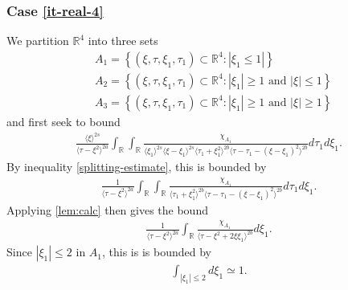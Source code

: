 \documentclass[12pt,reqno]{amsart}
\numberwithin{equation}{section}  %
\numberwithin{figure}{section}
\newcommand{\rr}{\mathbb{R}}
\theoremstyle{plain}
\theoremstyle{definition}
\theoremstyle{remark}
\begin{document}
\subsubsection{Case \eqref{it-real-4}} 
\label{sssec:case-it-real-4}
We partition $\rr^{4}$ into three sets 
%
%
\begin{equation*}
\begin{split}
  & A_{1} = \left\{ (\xi, \tau, \xi_{1}, \tau_{1}) \subset \rr^{4}: |
  \xi_{1} \le 1 | \right \} \\
  & A_{2} = \left\{ (\xi, \tau, \xi_{1}, \tau_{1}) \subset \rr^{4}:|
  \xi_{1} | \ge 1 \text{ and } | \xi| \le 1 \right \}
  \\
  & A_{3} = \left\{ (\xi, \tau, \xi_{1}, \tau_{1}) \subset \rr^{4}:|
  \xi_{1} | \ge 1 \text{ and } | \xi| \ge 1 \right \}
  \end{split}
\end{equation*}
%
%
and first seek to bound
%
%
\begin{equation}
  \label{case-2-region-1}
  \begin{split}
    \frac{ \langle \xi
    \rangle ^{2s}}{\langle \tau - \xi^{2} \rangle ^{2a}}
    \int_{\rr} \int_{\rr} \frac{\chi_{A_{1}}}{ \langle \xi_{1} \rangle ^{2s} \langle \xi-\xi_{1} \rangle ^{2s} 
    \langle \tau_{1} + \xi_{1}^{2} \rangle^{2b} \langle  \tau - \tau_{1} -
    (\xi - \xi_{1})^{2} \rangle^{2b} }
    d \tau_1 d \xi_{1}.
  \end{split}
\end{equation}
By inequality \eqref{splitting-estimate}, this is bounded by
%
%
\begin{equation*}
\begin{split}
  \frac{1}{\langle \tau - \xi^{2} \rangle ^{2a}} \int_{\rr} \int_{\rr}
  \frac{\chi_{A_{1}}}{\langle \tau_{1} + \xi_{1}^{2} \rangle ^{2b} \langle \tau
  - \tau_{1} - ( \xi - \xi_{1})^{2}\rangle ^{2b}} d \tau_{1} d \xi_{1}.
\end{split}
\end{equation*}
%
%
Applying \autoref{lem:calc} then gives the bound
%
%
\begin{equation}
\begin{split}
  \frac{1}{\langle \tau - \xi^{2} \rangle ^{2a}} \int_{\rr}
  \frac{\chi_{A_{1}}}{\langle \tau - \xi^{2} + 2 \xi \xi_{1} \rangle ^{2b}} d
  \xi_{1}.
\end{split}
\label{region-1-case-2-pre-est}
\end{equation}
%
%
Since $| \xi_{1} | \le 2$ in $A_{1}$, this is is bounded by
%
%
\begin{equation*}
\begin{split}
  \int_{| \xi_{1} | \le 2} d \xi_{1} \simeq 1.
\end{split}
\end{equation*}
\end{document}
